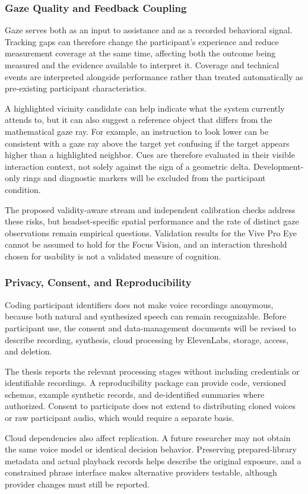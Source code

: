 \subsubsection{Gaze Quality and Feedback Coupling}
Gaze serves both as an input to assistance and as a recorded behavioral signal. Tracking gaps can therefore change the participant's experience and reduce measurement coverage at the same time, affecting both the outcome being measured and the evidence available to interpret it. Coverage and technical events are interpreted alongside performance rather than treated automatically as pre-existing participant characteristics.

A highlighted vicinity candidate can help indicate what the system currently attends to, but it can also suggest a reference object that differs from the mathematical gaze ray. For example, an instruction to look lower can be consistent with a gaze ray above the target yet confusing if the target appears higher than a highlighted neighbor. Cues are therefore evaluated in their visible interaction context, not solely against the sign of a geometric delta. Development-only rings and diagnostic markers will be excluded from the participant condition.

The proposed validity-aware stream and independent calibration checks address these risks, but headset-specific spatial performance and the rate of distinct gaze observations remain empirical questions. Validation results for the Vive Pro Eye cannot be assumed to hold for the Focus Vision, and an interaction threshold chosen for usability is not a validated measure of cognition.

\subsubsection{Privacy, Consent, and Reproducibility}
Coding participant identifiers does not make voice recordings anonymous, because both natural and synthesized speech can remain recognizable. Before participant use, the consent and data-management documents will be revised to describe recording, synthesis, cloud processing by ElevenLabs, storage, access, and deletion.

The thesis reports the relevant processing stages without including credentials or identifiable recordings. A reproducibility package can provide code, versioned schemas, example synthetic records, and de-identified summaries where authorized. Consent to participate does not extend to distributing cloned voices or raw participant audio, which would require a separate basis.

Cloud dependencies also affect replication. A future researcher may not obtain the same voice model or identical decision behavior. Preserving prepared-library metadata and actual playback records helps describe the original exposure, and a constrained phrase interface makes alternative providers testable, although provider changes must still be reported.
